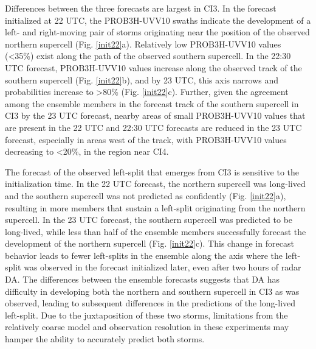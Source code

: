 Differences between the three forecasts are largest in CI3. In the forecast initialized at 22 UTC, the PROB3H-UVV10 swaths indicate the development of a left- and right-moving pair of storms originating near the position of the observed northern supercell (Fig. \ref{init22}a). Relatively low PROB3H-UVV10 values (\textless 35\%) exist along the path of the observed southern supercell. In the 22:30 UTC forecast, PROB3H-UVV10 values increase along the observed track of the southern supercell (Fig. \ref{init22}b), and by 23 UTC, this axis narrows and probabilities increase to \textgreater 80\% (Fig. \ref{init22}c). Further, given the agreement among the ensemble members in the forecast track of the southern supercell in CI3 by the 23 UTC forecast, nearby areas of small PROB3H-UVV10 values that are present in the 22 UTC and 22:30 UTC forecasts are reduced in the 23 UTC forecast, especially in areas west of the track, with PROB3H-UVV10 values decreasing to \textless 20\%, in the region near CI4.

The forecast of the observed left-split that emerges from CI3 is sensitive to the initialization time. In the 22 UTC forecast, the northern supercell was long-lived and the southern supercell was not predicted as confidently (Fig. \ref{init22}a), resulting in more members that sustain a left-split originating from the northern supercell. In the 23 UTC forecast, the southern supercell was predicted to be long-lived, while less than half of the ensemble members successfully forecast the development of the northern supercell (Fig. \ref{init22}c). This change in forecast behavior leads to fewer left-splits in the ensemble along the axis where the left-split was observed in the forecast initialized later, even after two hours of radar DA. The differences between the ensemble forecasts suggests that DA has difficulty in developing both the northern and southern supercell in CI3 as was observed, leading to subsequent differences in the predictions of the long-lived left-split. Due to the juxtaposition of these two storms, limitations from the relatively coarse model and observation resolution in these experiments may hamper the ability to accurately predict both storms.

